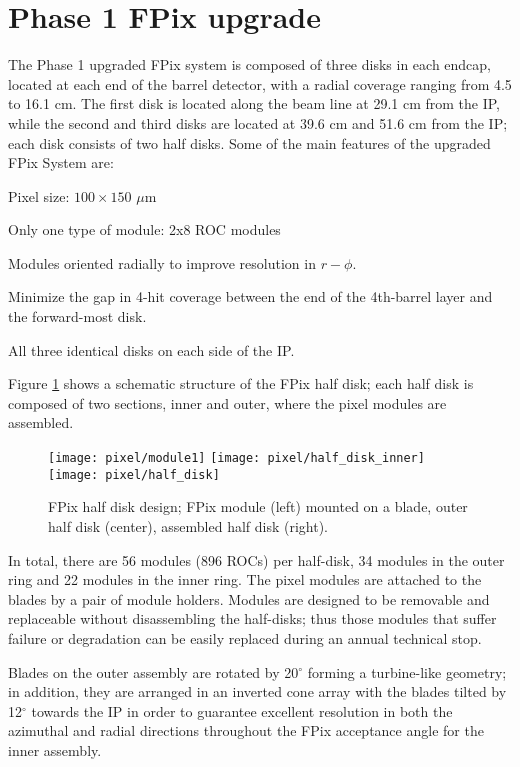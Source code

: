 \section{Phase 1 FPix upgrade}

The Phase 1 upgraded FPix system is composed of three disks in each endcap, located at each end of the barrel detector, with a radial coverage ranging from 4.5 to 16.1 cm. The first disk is located along the beam line at 29.1 cm from the IP, while the second and third disks are located at 39.6 cm and 51.6 cm from the IP; each disk consists of two half disks. Some of the main features of the upgraded FPix System are:
\bit
\item Pixel size: $100 \times 150$ $\mu$m 
\item Only one type of module: 2x8 ROC modules
\item Modules oriented radially to improve resolution in $r-\phi$.
\item Minimize the gap in 4-hit coverage between the end of the 4th-barrel layer and the forward-most disk.
\item All three identical disks on each side of the IP.
\eit

Figure \ref{fig:fpix_layout} shows a schematic structure of the FPix half disk; each half disk is composed of two sections, inner and outer, where the pixel modules are assembled.

\begin{figure}[!h]
  \centering
  \texttt{[image: pixel/module1]}
  \texttt{[image: pixel/half\_disk\_inner]}
  \texttt{[image: pixel/half\_disk]}
\caption[FPix half disk design.]{FPix half disk design; FPix module (left) mounted on a blade, outer half disk (center), assembled half disk (right).}\label{fig:fpix_layout}
\end{figure}

In total, there are 56 modules (896 ROCs) per half-disk, 34 modules in the outer ring and 22 modules in the inner ring. The pixel modules are attached to the blades by a pair of module holders. Modules are designed to be removable and replaceable without disassembling the half-disks; thus those modules that suffer failure or degradation can be easily replaced during an annual technical stop.

Blades on the outer assembly are rotated by 20$^\circ$ forming a turbine-like geometry; in addition, they are arranged in an inverted cone array with the blades tilted by 12$^\circ$ towards the IP in order to guarantee excellent resolution in both the azimuthal and radial directions throughout the FPix acceptance angle for the inner assembly.

